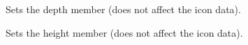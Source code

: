 \begin{comment}
\membersection{wxIcon::SaveFile}\label{wxiconsavefile}

\func{bool}{SaveFile}{\param{const wxString\& }{name}, \param{int}{ type}, \param{wxPalette* }{palette = NULL}}

Saves an icon in the named file.

\wxheading{Parameters}

\docparam{name}{A filename. The meaning of {\it name} is determined by the {\it type} parameter.}

\docparam{type}{One of the following values:

\twocolwidtha{5cm}
\begin{twocollist}
\twocolitem{{\bf wxBITMAP\_TYPE\_ICO}}{Save a Windows icon file.}
\twocolitem{{\bf wxBITMAP\_TYPE\_XPM}}{Save an XPM bitmap file.}
\end{twocollist}

The validity of these flags depends on the platform and wxWindows configuration.}

\docparam{palette}{An optional palette used for saving the icon.}

\wxheading{Return value}

TRUE if the operation succeeded, FALSE otherwise.

\wxheading{Remarks}

Depending on how wxWindows has been configured, not all formats may be available.

\wxheading{See also}

\helpref{wxIcon::LoadFile}{wxiconloadfile}
\end{comment}

\label{wxiconsetdepth}


Sets the depth member (does not affect the icon data).



\label{wxiconsetheight}


Sets the height member (does not affect the icon data).


